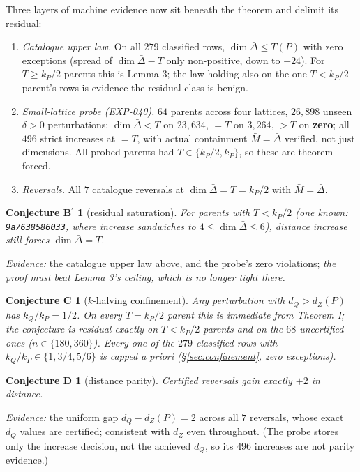 \documentclass[11pt]{article}
\theoremstyle{plain}
\newtheorem*{conjBprime}{Conjecture B$^{\prime}$}
\newtheorem*{conjC}{Conjecture C}
\newtheorem*{conjD}{Conjecture D}
\theoremstyle{remark}
\begin{document}
Three layers of machine evidence now sit beneath the theorem and delimit its
residual:
\begin{enumerate}
\item \emph{Catalogue upper law.} On all $279$ classified rows,
   $\dim\bar\Delta\le T(P)$ with zero exceptions (spread of
   $\dim\bar\Delta-T$ only non-positive, down to $-24$). For $T\ge k_P/2$
   parents this is Lemma 3; the law holding also on the one $T<k_P/2$ parent's
   rows is evidence the residual class is benign.
\item \emph{Small-lattice probe (EXP-040).} $64$ parents across four lattices,
   $26{,}898$ unseen $\delta>0$ perturbations: $\dim\bar\Delta<T$ on $23{,}634$,
   $=T$ on $3{,}264$, $>T$ on \textbf{zero}; all $496$ strict increases at $=T$, with
   actual containment $\bar M=\bar\Delta$ verified, not just dimensions. All
   probed parents had $T\in\{k_P/2,k_P\}$, so these are theorem-forced.
\item \emph{Reversals.} All $7$ catalogue reversals at $\dim\bar\Delta=T=k_P/2$ with
   $\bar M=\bar\Delta$.
\end{enumerate}

\begin{conjBprime}[residual saturation]
For parents with $T<k_P/2$ (one known:
\texttt{9a7638586033}, where increase sandwiches to $4\le\dim\bar\Delta\le 6$),
distance increase still forces $\dim\bar\Delta=T$.
\end{conjBprime}
\emph{Evidence:} the catalogue
upper law above, and the probe's zero violations; \emph{the proof must beat Lemma 3's
ceiling, which is no longer tight there.}

\begin{conjC}[$k$-halving confinement]
Any perturbation with $d_Q>d_Z(P)$
has $k_Q/k_P=1/2$. On every $T=k_P/2$ parent this is immediate from
Theorem I; the conjecture is residual exactly on $T<k_P/2$ parents and on the
$68$ uncertified ones ($n\in\{180,360\}$). Every one of the $279$ classified
rows with $k_Q/k_P\in\{1,3/4,5/6\}$ is capped \emph{a priori} (\S\ref{sec:confinement}, zero
exceptions).
\end{conjC}

\begin{conjD}[distance parity]
Certified reversals gain exactly $+2$ in
distance.
\end{conjD}
\emph{Evidence:} the uniform gap $d_Q-d_Z(P)=2$ across all $7$ reversals,
whose exact $d_Q$ values are certified; consistent with $d_Z$ even throughout.
(The probe stores only the increase decision, not the achieved $d_Q$, so its
$496$ increases are not parity evidence.)
\end{document}
